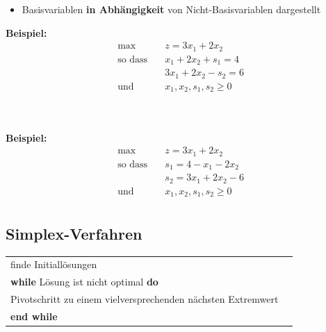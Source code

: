 \documentclass{article}
\begin{document}
\begin{vsbox}[title=Standardform vs. Schlupfform]
\begin{minipage}{8cm}
\begin{itemize}
    \item Basisvariablen  \textbf{in Abhängigkeit} von Nicht-Basisvariablen dargestellt
\end{itemize}
\end{minipage}
\begin{minipage}{8cm}
\bigskip \textbf{Beispiel:}
\begin{align*}
        \text{max} \quad &  z = 3x_1 + 2x_2 \\
    \text{so dass} \quad & x_1+2x_2+s_1 = 4 \\
    & 3x_1+2x_2-s_2=6  \\
    \text{und}\quad & x_1,x_2,s_1,s_2 \geq 0 \\
\end{align*}
\end{minipage}
\begin{minipage}{0.5cm}
$\ $
\end{minipage}
\begin{minipage}{8cm}
\bigskip \textbf{Beispiel:}
\begin{align*}
    \text{max} \quad &  z = 3x_1 + 2x_2 \\
    \text{so dass} \quad & s_1=4-x_1-2x_2 \\
    & s_2=3x_1+2x_2-6 \\
    \text{und}\quad &  x_1,x_2,s_1,s_2 \geq 0 \\
\end{align*}
\end{minipage} 

\end{vsbox}

\newpage
\subsection{Simplex-Verfahren}
\begin{algorithm}[H]
\caption{Simplex-Verfahren}\label{alg:weighted_vertex_cover}
    \centering
    \begin{tabular}{p{10cm} p{7cm}}
        finde Initiallösungen & \\
        \textbf{while} Lösung ist nicht optimal \textbf{do} & \\
        \setlength\parindent{12pt} Pivotschritt zu einem vielversprechenden nächsten Extremwert & \\
        \textbf{end while} & \\
    \end{tabular}
    \label{tab:my_label}
\end{algorithm}
\end{document}
